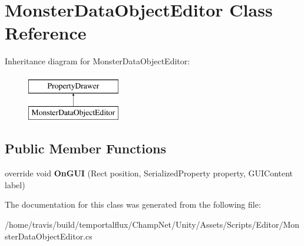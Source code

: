 \hypertarget{class_monster_data_object_editor}{\section{Monster\-Data\-Object\-Editor Class Reference}
\label{class_monster_data_object_editor}
}
Inheritance diagram for Monster\-Data\-Object\-Editor\-:\begin{figure}[H]
\begin{center}
\leavevmode
\includegraphics[height=2.000000cm]{class_monster_data_object_editor}
\end{center}
\end{figure}
\subsection*{Public Member Functions}
\begin{DoxyCompactItemize}
\item 
\hypertarget{class_monster_data_object_editor_a6f68c967f408d0c49b48518848c4a6ed}{override void {\bfseries On\-G\-U\-I} (Rect position, Serialized\-Property property, G\-U\-I\-Content label)}\label{class_monster_data_object_editor_a6f68c967f408d0c49b48518848c4a6ed}

\end{DoxyCompactItemize}


The documentation for this class was generated from the following file\-:\begin{DoxyCompactItemize}
\item 
/home/travis/build/temportalflux/\-Champ\-Net/\-Unity/\-Assets/\-Scripts/\-Editor/Monster\-Data\-Object\-Editor.\-cs\end{DoxyCompactItemize}
